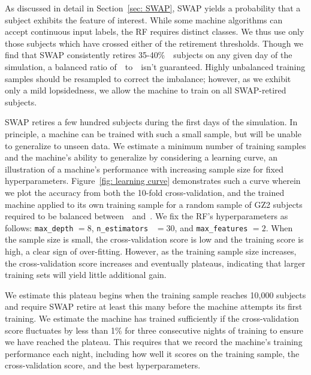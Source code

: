 As discussed in detail in Section~\ref{sec: SWAP}, SWAP yields a probability that 
a subject exhibits the feature of interest. While some machine algorithms can 
accept continuous input labels, the RF requires distinct classes. We thus use only 
those subjects which have crossed either of the retirement thresholds. 
Though we find that SWAP consistently retires 35-40\%~\feat~subjects on 
any given day of the simulation, a balanced ratio of~\feat~to~\notfeat~isn't guaranteed.
 Highly unbalanced training samples should be resampled to correct the imbalance; 
however, as we exhibit only a mild lopsidedness, we allow the machine to train on all 
SWAP-retired subjects.  

SWAP retires a few hundred subjects during the first days of the simulation.
In principle,  a machine can be trained with such a small sample, but will be unable
to generalize to unseen data. We estimate a minimum number of training samples
and the machine's ability to generalize by considering a learning curve, an illustration
of a machine's performance with increasing sample size for fixed hyperparameters. 
Figure~\ref{fig: learning curve} demonstrates such a curve wherein we plot
the accuracy from both the 10-fold cross-validation, and the trained machine
applied to its own training sample for a random sample of GZ2 subjects
required to be balanced between~\feat~and~\notfeat.  
We fix the RF's hyperparameters as follows: \texttt{max\_depth} $=8$, 
\texttt{n\_estimators } $=30$, and \texttt{max\_features} $=2$. 
When the sample size is small, the cross-validation score is low and the training 
score is high, a clear sign of over-fitting.  However, as the training 
sample size increases, the cross-validation score increases and eventually plateaus,
 indicating that larger training sets will yield little additional gain. 

We estimate this plateau begins when the training 
sample reaches 10,000 subjects and require SWAP retire at least this many 
 before the machine attempts its first training.  We estimate the machine 
has trained sufficiently if the cross-validation score fluctuates by less than 1\% 
for three consecutive nights of training to ensure we have reached the plateau.  
This requires that we record the machine's training performance each night, 
including how well it scores on the training sample, the 
cross-validation score, and the best hyperparameters. 




